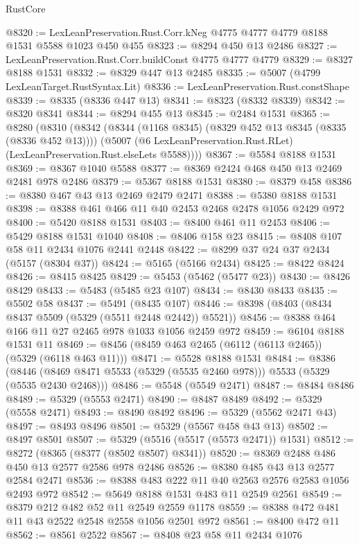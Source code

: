 \begin{lexlean}{RustCore}
\begin{coremodule}
@8320 := LexLeanPreservation.Rust.Corr.kNeg @4775 @4777 @4779 @8188 @1531 @5588 @1023 @450 @455
@8323 := @8294 @450 @13 @2486
@8327 := LexLeanPreservation.Rust.Corr.buildConst @4775 @4777 @4779
@8329 := @8327 @8188 @1531
@8332 := @8329 @447 @13 @2485
@8335 := @5007 (@4799 LexLeanTarget.RustSyntax.Lit)
@8336 := LexLeanPreservation.Rust.constShape
@8339 := @8335 (@8336 @447 @13)
@8341 := @8323 (@8332 @8339)
@8342 := @8320 @8341
@8344 := @8294 @455 @13
@8345 := @2484 @1531
@8365 := @8280
    (@8310
      (@8342
        (@8344 (@1168 @8345) (@8329 @452 @13 @8345 (@8335 (@8336 @452 @13))))
        (@5007 (@6 LexLeanPreservation.Rust.RLet) (LexLeanPreservation.Rust.elseLets @5588))))
@8367 := @5584 @8188 @1531
@8369 := @8367 @1040 @5588
@8377 := @8369 @2424 @468 @450 @13 @2469 @2481 @978 @2486
@8379 := @5367 @8188 @1531
@8380 := @8379 @458
@8386 := @8380 @467 @43 @13 @2469 @2479 @2471
@8388 := @5380 @8188 @1531
@8398 := @8388 @461 @466 @11 @40 @2453 @2468 @2478 @1056 @2429 @972
@8400 := @5420 @8188 @1531
@8403 := @8400 @461 @11 @2453
@8406 := @5429 @8188 @1531 @1040
@8408 := @8406 @158 @23
@8415 := @8408 @107 @58 @11 @2434 @1076 @2441 @2448
@8422 := @8299 @37 @24 @37 @2434 (@5157 (@8304 @37))
@8424 := @5165 (@5166 @2434)
@8425 := @8422 @8424
@8426 := @8415 @8425
@8429 := @5453 (@5462 (@5477 @23))
@8430 := @8426 @8429
@8433 := @5483 (@5485 @23 @107)
@8434 := @8430 @8433
@8435 := @5502 @58
@8437 := @5491 (@8435 @107)
@8446 := @8398 (@8403 (@8434 @8437 @5509 (@5329 (@5511 @2448 @2442)) @5521))
@8456 := @8388 @464 @166 @11 @27 @2465 @978 @1033 @1056 @2459 @972
@8459 := @6104 @8188 @1531 @11
@8469 := @8456 (@8459 @463 @2465 (@6112 (@6113 @2465)) (@5329 (@6118 @463 @11)))
@8471 := @5528 @8188 @1531
@8484 := @8386
    (@8446 (@8469 @8471 @5533 (@5329 (@5535 @2460 @978))) @5533 (@5329 (@5535 @2430 @2468)))
@8486 := @5548 (@5549 @2471)
@8487 := @8484 @8486
@8489 := @5329 (@5553 @2471)
@8490 := @8487 @8489
@8492 := @5329 (@5558 @2471)
@8493 := @8490 @8492
@8496 := @5329 (@5562 @2471 @43)
@8497 := @8493 @8496
@8501 := @5329 (@5567 @458 @43 @13)
@8502 := @8497 @8501
@8507 := @5329 (@5516 (@5517 (@5573 @2471)) @1531)
@8512 := @8272 (@8365 (@8377 (@8502 @8507) @8341))
@8520 := @8369 @2488 @486 @450 @13 @2577 @2586 @978 @2486
@8526 := @8380 @485 @43 @13 @2577 @2584 @2471
@8536 := @8388 @483 @222 @11 @40 @2563 @2576 @2583 @1056 @2493 @972
@8542 := @5649 @8188 @1531 @483 @11 @2549 @2561
@8549 := @8379 @212 @482 @52 @11 @2549 @2559 @1178
@8559 := @8388 @472 @481 @11 @43 @2522 @2548 @2558 @1056 @2501 @972
@8561 := @8400 @472 @11
@8562 := @8561 @2522
@8567 := @8408 @23 @58 @11 @2434 @1076

\end{coremodule}
\end{lexlean}
